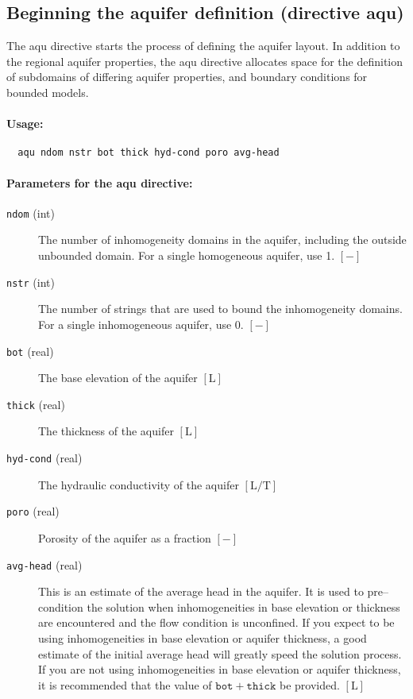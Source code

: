 \subsection{Beginning the aquifer definition (directive \textsf{aqu})}

The \textsf{aqu} directive starts the process of defining the aquifer
layout. In addition to the regional aquifer properties, the aqu directive
allocates space for the definition of subdomains of differing aquifer
properties, and boundary conditions for bounded models.

\paragraph{Usage:}
\begin{verbatim}
  aqu ndom nstr bot thick hyd-cond poro avg-head
\end{verbatim}

\paragraph{Parameters for the \textsf{\textmd{aqu}} directive:}
\begin{description}
\item [{\texttt{ndom}} (int)] The number of inhomogeneity domains in the aquifer, including the outside unbounded domain. For a single homogeneous aquifer, use 1. $[-]$
\item [{\texttt{nstr}} (int)] The number of strings that are used to bound the inhomogeneity domains. For a single inhomogeneous aquifer, use 0. $[-]$
\item [{\texttt{bot}} (real)] The base elevation of the aquifer $[\mathrm{L}]$
\item [{\texttt{thick}} (real)] The thickness of the aquifer $[\mathrm{L}]$
\item [{\texttt{hyd-cond}} (real)] The hydraulic conductivity of the aquifer $[\mathrm{L/T}]$
\item [{\texttt{poro}} (real)] Porosity of the aquifer as a fraction $[-]$
\item [{\texttt{avg-head}} (real)] This is an estimate of the average head in the aquifer. It is used to pre--condition the solution when inhomogeneities in base elevation or thickness are encountered and the flow condition is unconfined. If you expect to be using inhomogeneities in base elevation or aquifer thickness, a good estimate of the initial average head will greatly speed the solution process. If you are not using inhomogeneities in base elevation or aquifer thickness, it is recommended that the value of $\mathtt{bot+thick}$ be provided. $[\mathrm{L}]$
\end{description}

